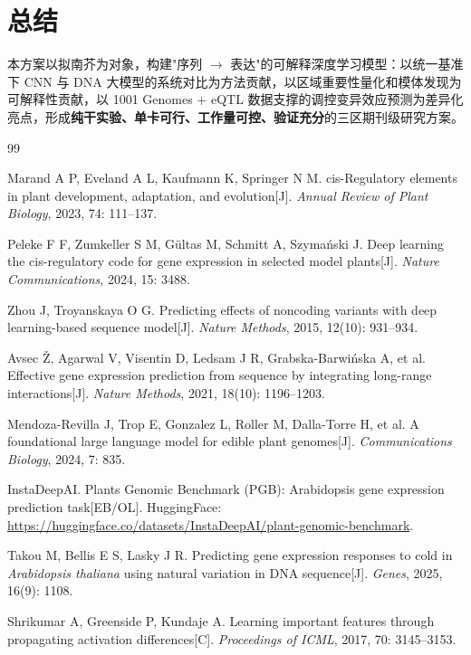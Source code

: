 \documentclass[UTF8,11pt,a4paper]{ctexart}
\begin{document}
\section{总结}
\label{sec:summary}

本方案以拟南芥为对象，构建"序列 $\rightarrow$ 表达"的可解释深度学习模型：以统一基准下 CNN 与 DNA 大模型的系统对比为方法贡献，以区域重要性量化和模体发现为可解释性贡献，以 1001 Genomes + eQTL 数据支撑的调控变异效应预测为差异化亮点，形成\textbf{纯干实验、单卡可行、工作量可控、验证充分}的三区期刊级研究方案。

\begin{thebibliography}{99}
\small
\setlength{\itemsep}{2pt}

Marand A P, Eveland A L, Kaufmann K, Springer N M.
cis-Regulatory elements in plant development, adaptation, and evolution[J].
\emph{Annual Review of Plant Biology}, 2023, 74: 111--137.

Peleke F F, Zumkeller S M, Gültas M, Schmitt A, Szymański J.
Deep learning the cis-regulatory code for gene expression in selected model plants[J].
\emph{Nature Communications}, 2024, 15: 3488.

Zhou J, Troyanskaya O G.
Predicting effects of noncoding variants with deep learning-based sequence model[J].
\emph{Nature Methods}, 2015, 12(10): 931--934.

Avsec Ž, Agarwal V, Visentin D, Ledsam J R, Grabska-Barwińska A, et al.
Effective gene expression prediction from sequence by integrating long-range interactions[J].
\emph{Nature Methods}, 2021, 18(10): 1196--1203.

Mendoza-Revilla J, Trop E, Gonzalez L, Roller M, Dalla-Torre H, et al.
A foundational large language model for edible plant genomes[J].
\emph{Communications Biology}, 2024, 7: 835.

InstaDeepAI.
Plants Genomic Benchmark (PGB): Arabidopsis gene expression prediction task[EB/OL].
HuggingFace: \url{https://huggingface.co/datasets/InstaDeepAI/plant-genomic-benchmark}.

Takou M, Bellis E S, Lasky J R.
Predicting gene expression responses to cold in \emph{Arabidopsis thaliana} using natural variation in DNA sequence[J].
\emph{Genes}, 2025, 16(9): 1108.

Shrikumar A, Greenside P, Kundaje A.
Learning important features through propagating activation differences[C].
\emph{Proceedings of ICML}, 2017, 70: 3145--3153.


\end{thebibliography}
\end{document}
